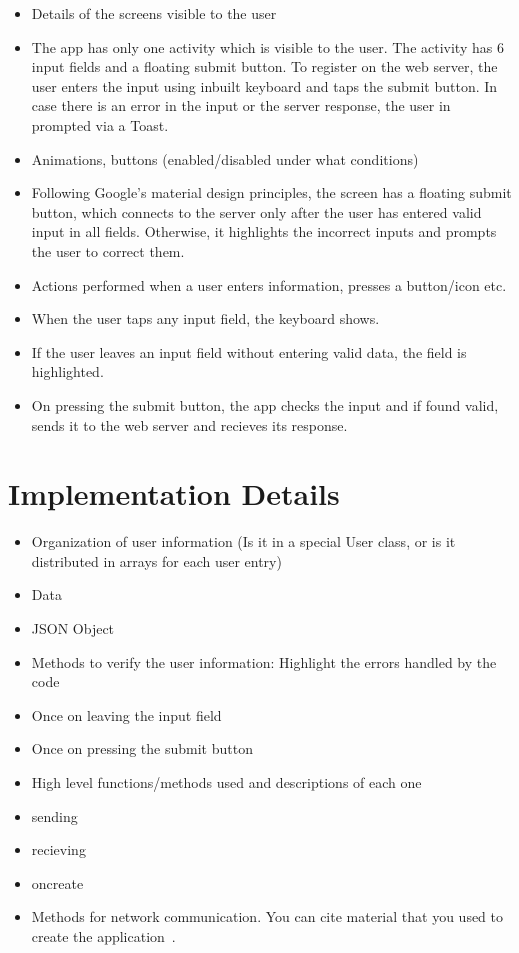 \documentclass[12pt,a4paper,titlepage]{article}
\begin{document}
\begin{itemize}
	\item Details of the screens visible to the user
	\item[] The app has only one activity which is visible to the user. The activity has 6 input fields and a floating submit button. To register on the web server, the user enters the input using inbuilt keyboard and taps the submit button. In case there is an error in the input or the server response, the user in prompted via a Toast.
	      
	\item Animations, buttons (enabled/disabled under what conditions)
	\item[] Following Google's material design principles, the screen has a floating submit button, which connects to the server only after the user has entered valid input in all fields. Otherwise, it highlights the incorrect inputs and prompts the user to correct them.
	\item Actions performed when a user enters information, presses a button/icon etc.
	\item[] When the user taps any input field, the keyboard shows. 
	\item[] If the user leaves an input field without entering valid data, the field is highlighted.
	\item[] On pressing the submit button, the app checks the input and if found valid, sends it to the web server and recieves its response.
\end{itemize}

\section{Implementation Details}

\begin{itemize}
	\item Organization of user information (Is it in a special User class, or is it distributed in arrays for each user entry)
	\item[] Data
	\item[] JSON Object
	\item Methods to verify the user information: Highlight the errors handled by the code
	\item[] Once on leaving the input field
	\item[] Once on pressing the submit button
	\item  High	level functions/methods used and descriptions of each one	
	\item [] sending
	\item[] recieving
	\item[] oncreate
	\item Methods for network communication. You can cite material that you used to create the application~\cite{android_network_tutorial}.
\end{itemize}
\end{document}
